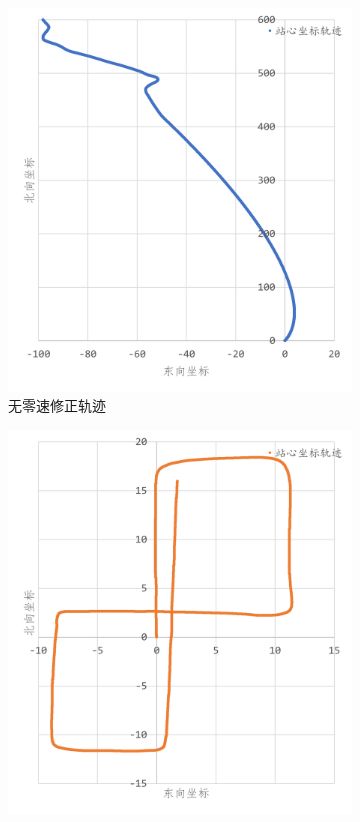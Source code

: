 \documentclass[10pt,a4paper]{ctexart}
\begin{document}
\begin{figure}[H]
    \centering
    {
        \begin{subfigure}{0.49\textwidth}
            \centering
            \includegraphics[width=\linewidth]{Figures/DataFigure/无零速修正前37000历元.png}
            \caption{无零速修正轨迹}
        \end{subfigure}\hfill
        \begin{subfigure}{0.49\textwidth}
            \centering
            \includegraphics[width=\linewidth]{Figures/DataFigure/零速修正前37000历元.png}

\end{subfigure}}
\end{figure}
\end{document}
